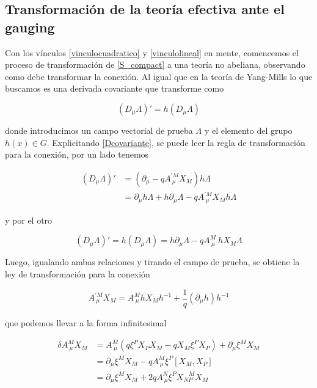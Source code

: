\documentclass{article}
\numberwithin{equation}{section}
\begin{document}
\subsection{Transformación de la teoría efectiva ante el gauging}

Con los vínculos \ref{vinculocuadratico} y \ref{vinculolineal} en mente, comencemos el proceso de transformación de \ref{S_compact} a una teoría no abeliana, observando como debe transformar la conexión. Al igual que en la teoría de Yang-Mills lo que buscamos es una derivada covariante que transforme como

\begin{equation}\label{Dcovariante}
\left(D_{\mu} \Lambda\right)' =  h \left( D_{\mu} \Lambda\right) 
\end{equation} 

donde introducimos un campo vectorial de prueba $ \Lambda $ y el elemento del grupo $ h(x) \in G $. Explicitando \ref{Dcovariante}, se puede leer la regla de transformación para 
la conexión, por un lado tenemos

\begin{equation}
\begin{aligned}
\left(D_{\mu} \Lambda\right)' &= \left( \partial_{\mu} - q A^{'M}_{\ \mu} X_M\right) h \Lambda\\
&= \partial_{\mu} h \Lambda + h \partial_{\mu} \Lambda - q A^{'M}_{\ \mu} X_M h \Lambda
\end{aligned}
\end{equation}

y por el otro

\begin{equation}
\left(D_{\mu} \Lambda\right)' = h \left(D_{\mu} \Lambda\right) = h\partial_{\mu}\Lambda - q A^M_{\ \mu} \ h X_M \Lambda
\end{equation}

Luego, igualando ambas relaciones y tirando el campo de prueba, se obtiene la ley de transformación para la conexión

\begin{equation}
A^{'M}_{\ \mu} X_M = A^M_{\ \mu} h X_M h^{-1} + \frac{1}{q} \left( \partial_{\mu} h\right)h^{-1}
\end{equation}

que podemos llevar a la forma infinitesimal

\begin{equation}
\begin{aligned}
\delta A^M_{\ \mu} X_M &= A^M_{\ \mu} \left( q \xi^P X_P X_M -q X_M \xi^P X_P \right)  + \partial_{\mu} \xi^M X_M\\
&= \partial_{\mu} \xi^M X_M - q A^M_{\ \mu} \xi^P \left[X_M, X_P\right]\\
&= \partial_{\mu} \xi^M X_M + 2q A^N_{\ \mu} \xi^P X_{N P}^{\ \ \ \ M} X_M
\end{aligned}
\end{equation}
\end{document}
